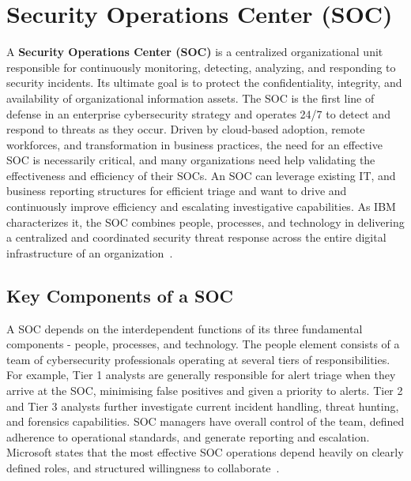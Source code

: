 \section{Security Operations Center (SOC)}\vspace{-0.5em}

A \textbf{Security Operations Center (SOC)} is a centralized organizational unit responsible for continuously monitoring, detecting, analyzing, and responding to security incidents. Its ultimate goal is to protect the confidentiality, integrity, and availability of organizational information assets. The SOC is the first line of defense in an enterprise cybersecurity strategy and operates 24/7 to detect and respond to threats as they occur. Driven by cloud-based adoption, remote workforces, and transformation in business practices, the need for an effective SOC is necessarily critical, and many organizations need help validating the effectiveness and efficiency of their SOCs. An SOC can leverage existing IT, and business reporting structures for efficient triage and want to drive and continuously improve efficiency and escalating investigative capabilities. As IBM characterizes it, the SOC combines people, processes, and technology in delivering a centralized and coordinated security threat response across the entire digital infrastructure of an organization~\cite{ibm}.

\subsection{Key Components of a SOC}\vspace{-0.5em}

A SOC depends on the interdependent functions of its three fundamental components - people, processes, and technology. The people element consists of a team of cybersecurity professionals operating at several tiers of responsibilities. For example, Tier 1 analysts are generally responsible for alert triage when they arrive at the SOC, minimising false positives and given a priority to alerts. Tier 2 and Tier 3 analysts further investigate current incident handling, threat hunting, and forensics capabilities. SOC managers have overall control of the team, defined adherence to operational standards, and generate reporting and escalation. Microsoft states that the most effective SOC operations depend heavily on clearly defined roles, and structured willingness to collaborate~\cite{microsoft}. 

